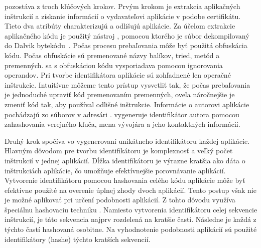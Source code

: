  pozostáva z troch kľúčových krokov. Prvým krokom je extrakcia aplikačných inštrukcií a získanie informácií o vydavateľovi aplikácie v podobe certifikátu. Tieto dva atribúty charakterizujú a odlišujú aplikácie.
Za účelom extrakcie aplikačného kódu je použitý nástroj , pomocou ktorého je súbor  dekompilovaný do Dalvik bytekódu~\cite{smali}.  Počas procesu prebaľovania môže byť použitá obfuskácia kódu. Počas obfuskácie sú premenované názvy balíkov, tried, metód a premenných.  sa s obfuskáciou kódu vysporiadava pomocou ignorovania operandov. Pri tvorbe identifikátora aplikácie sú zohľadnené len operačné inštrukcie. Intuitívne môžeme tento prístup vysvetliť tak, že počas prebaľovania je jednoduché upraviť kód premenovaním premenných, oveľa náročnejšie je zmeniť kód tak, aby používal odlišné inštrukcie. 
Informácie o autorovi aplikácie pochádzajú zo súborov v adresári .  vygeneruje identifikátor autora pomocou zahashovania verejného kľuča, mena vývojára a jeho kontaktných informácií. 


Druhý krok spočíva vo vygenerovaní unikátneho identifikátoru každej aplikácie. Hlavným dôvodom pre tvorbu identifikátoru je komplexnosť a veľký počet inštrukcií v jednej aplikácií. Dĺžka identifikátoru je výrazne kratšia ako dáta o inštrukciách aplikácie, čo umožňuje efektívnejšie porovnávanie aplikácií. 
Vytvorenie identifikátoru pomocou hashovania celého kódu aplikácie môže byť efektívne použité na overenie úplnej zhody dvoch aplikácií. Tento postup však nie je možné aplikovať pri určení podobnosti aplikácií.  Z tohto dôvodu využíva  špeciálnu hashovaciu techniku  \cite{fuzzyHashing}. Namiesto vytvorenia identifikátoru celej sekvencie inštrukcií, je táto sekvencia najprv rozdelená na kratšie časti. Následne je každá z týchto častí hashovaná osobitne. Na vyhodnotenie podobnosti aplikácií sú použité identifikátory (hashe) týchto kratších sekvencií.


